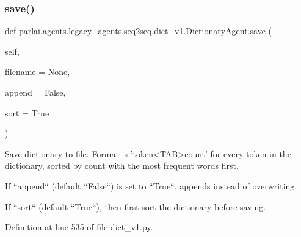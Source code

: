 \subsubsection{\texorpdfstring{save()}{save()}}
{\footnotesize\ttfamily def parlai.\+agents.\+legacy\+\_\+agents.\+seq2seq.\+dict\+\_\+v1.\+Dictionary\+Agent.\+save (\begin{DoxyParamCaption}\item[{}]{self,  }\item[{}]{filename = {\ttfamily None},  }\item[{}]{append = {\ttfamily False},  }\item[{}]{sort = {\ttfamily True} }\end{DoxyParamCaption})}

\begin{DoxyVerb}Save dictionary to file.
Format is 'token<TAB>count' for every token in the dictionary, sorted
by count with the most frequent words first.

If ``append`` (default ``False``) is set to ``True``, appends instead of
overwriting.

If ``sort`` (default ``True``), then first sort the dictionary before saving.
\end{DoxyVerb}
 

Definition at line 535 of file dict\+\_\+v1.\+py.



